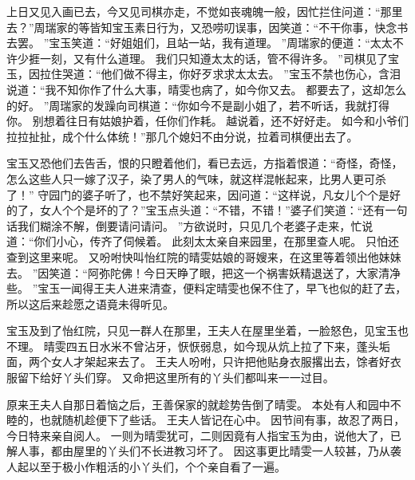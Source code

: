 上日又见入画已去，今又见司棋亦走，不觉如丧魂魄一般，因忙拦住问道：“那里去？”周瑞家的等皆知宝玉素日行为，又恐唠叨误事，因笑道：“不干你事，快念书去罢。
”宝玉笑道：“好姐姐们，且站一站，我有道理。
”周瑞家的便道：“太太不许少捱一刻，又有什么道理。
我们只知遵太太的话，管不得许多。
”司棋见了宝玉，因拉住哭道：“他们做不得主，你好歹求求太太去。
”宝玉不禁也伤心，含泪说道：“我不知你作了什么大事，晴雯也病了，如今你又去。
都要去了，这却怎么的好。
”周瑞家的发躁向司棋道：“你如今不是副小姐了，若不听话，我就打得你。
别想着往日有姑娘护着，任你们作耗。
越说着，还不好好走。
如今和小爷们拉拉扯扯，成个什么体统！”那几个媳妇不由分说，拉着司棋便出去了。
\par
宝玉又恐他们去告舌，恨的只瞪着他们，看已去远，方指着恨道：“奇怪，奇怪，怎么这些人只一嫁了汉子，染了男人的气味，就这样混帐起来，比男人更可杀了！” 守园门的婆子听了，也不禁好笑起来，因问道：“这样说，凡女儿个个是好的了，女人个个是坏的了？”宝玉点头道：“不错，不错！”婆子们笑道：“还有一句话我们糊涂不解，倒要请问请问。
”方欲说时，只见几个老婆子走来，忙说道：“你们小心，传齐了伺候着。
此刻太太亲自来园里，在那里查人呢。
只怕还查到这里来呢。
又吩咐快叫怡红院的晴雯姑娘的哥嫂来，在这里等着领出他妹妹去。
”因笑道：“阿弥陀佛！今日天睁了眼，把这一个祸害妖精退送了，大家清净些。
”宝玉一闻得王夫人进来清查，便料定晴雯也保不住了，早飞也似的赶了去，所以这后来趁愿之语竟未得听见。
\par
宝玉及到了怡红院，只见一群人在那里，王夫人在屋里坐着，一脸怒色，见宝玉也不理。
晴雯四五日水米不曾沾牙，恹恹弱息，如今现从炕上拉了下来，蓬头垢面，两个女人才架起来去了。
王夫人吩咐，只许把他贴身衣服撂出去，馀者好衣服留下给好丫头们穿。
又命把这里所有的丫头们都叫来一一过目。
\par
原来王夫人自那日着恼之后，王善保家的就趁势告倒了晴雯。
本处有人和园中不睦的，也就随机趁便下了些话。
王夫人皆记在心中。
因节间有事，故忍了两日，今日特来亲自阅人。
一则为晴雯犹可，二则因竟有人指宝玉为由，说他大了，已解人事，都由屋里的丫头们不长进教习坏了。
因这事更比晴雯一人较甚，乃从袭人起以至于极小作粗活的小丫头们，个个亲自看了一遍。
